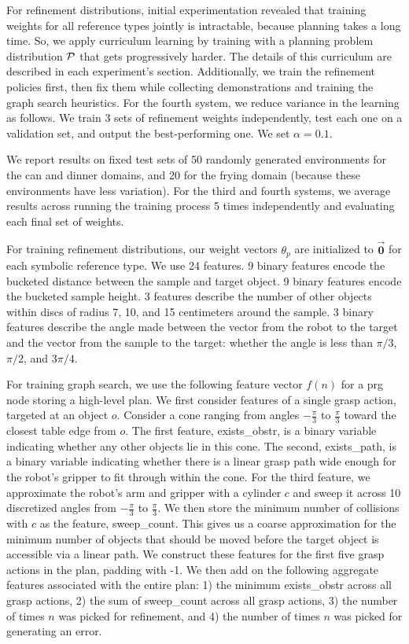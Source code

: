 For refinement distributions, initial experimentation revealed that training weights for all reference types jointly is intractable,
because planning takes a long time. So, we apply curriculum learning by training with a planning problem distribution
$\mathcal{P}$ that gets progressively harder. The details of this curriculum are described in each experiment's section.
Additionally, we train the refinement policies first, then fix them while collecting demonstrations and training the graph search heuristics.
For the fourth system, we reduce variance in the learning as follows. We train 3 sets of refinement weights independently,
test each one on a validation set, and output the best-performing one. We set $\alpha = 0.1$.

We report results on fixed test sets of 50 randomly generated environments for the can and dinner domains,
and 20 for the frying domain (because these environments have less variation).
For the third and fourth systems, we average results across running the training
process 5 times independently and evaluating each final set of weights.

For training refinement distributions, our weight vectors $\theta_{p}$ are initialized to $\vec{\mathbf{0}}$ for each symbolic reference type.
We use 24 features. 9 binary features encode the bucketed distance between the sample
and target object. 9 binary features encode the bucketed sample height. 3 features
describe the number of other objects within discs of radius 7, 10, and 15 centimeters around the
sample. 3 binary features describe the angle made between the vector from the
robot to the target and the vector from the sample to the target: whether the angle is less than
$\pi/3$, $\pi/2$, and $3\pi/4$.

For training graph search, we use the following feature vector $f(n)$ for a {\sc prg} node storing a high-level plan.
We first consider features of a single grasp action, targeted
at an object $o$. Consider a cone ranging from angles $-\frac{\pi}{3}$ to $\frac{\pi}{3}$
toward the closest table edge from $o$. The first feature, exists\_obstr, is a binary variable indicating
whether any other objects lie in this cone. The second, exists\_path, is a binary variable indicating whether there is a linear
grasp path wide enough for the robot's gripper to fit through within the cone. For the third feature, we approximate the robot's arm and gripper with a cylinder $c$ and sweep it across 10 discretized angles from $-\frac{\pi}{3}$ to
$\frac{\pi}{3}$. We then store the minimum number of collisions with $c$ as the feature, sweep\_count. This gives us a coarse approximation for the minimum number of objects that should be moved before the target object is accessible via a linear path.
We construct these features for the first five grasp actions in the plan, padding with -1.
We then add on the following aggregate features associated with the entire plan: 1) the minimum exists\_obstr across all grasp actions,
2) the sum of sweep\_count across all grasp actions, 3) the number of times $n$ was picked for refinement,
and 4) the number of times $n$ was picked for generating an error.

